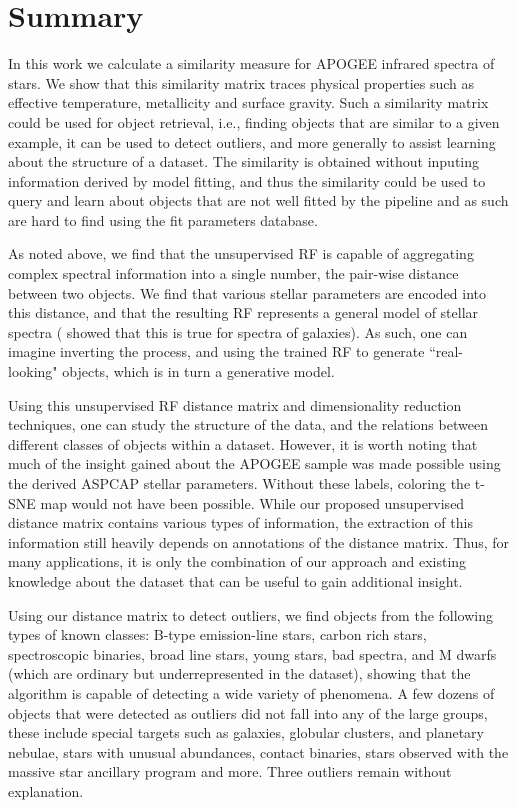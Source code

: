 \documentclass[fleqn,usenatbib]{mnras}
\begin{document}
\section{Summary}
\label{sec:sum}
In this work we calculate a similarity measure for APOGEE infrared spectra of stars. We show that this similarity matrix traces physical properties such as effective temperature, metallicity and surface gravity.  Such a similarity matrix could be used for object retrieval, i.e., finding objects that are similar to a given example, it can be used to detect outliers, and more generally to assist learning about the structure of a dataset. The similarity is obtained without inputing information derived by model fitting, and thus the similarity could be used to query and learn about objects that are not well fitted by the pipeline and as such are hard to find using the fit parameters database.

As noted above, we find that the unsupervised RF is capable of aggregating complex spectral information into a single number, the pair-wise distance between two objects. We find that various stellar parameters are encoded into this distance, and that the resulting RF represents a general model of stellar spectra (\cite{baron17a} showed that this is true for spectra of galaxies). As such, one can imagine inverting the process, and using the trained RF to generate ``real-looking" objects, which is in turn a generative model.

Using this unsupervised RF distance matrix and dimensionality reduction techniques, one can study the structure of the data, and the relations between different classes of objects within a dataset. However, it is worth noting that much of the insight gained about the APOGEE sample was made possible using the derived ASPCAP stellar parameters. Without these labels, coloring the t-SNE map would not have been possible. While our proposed unsupervised distance matrix contains various types of information, the extraction of this information still heavily depends on annotations of the distance matrix. Thus, for many applications, it is only the combination of our approach and existing knowledge about the dataset that can be useful to gain additional insight. 

Using our distance matrix to detect outliers, we find objects from the following types of known classes: B-type emission-line stars, carbon rich stars, spectroscopic binaries, broad line stars, young stars, bad spectra, and M dwarfs (which are ordinary but underrepresented in the dataset), showing that the algorithm is capable of detecting a wide variety of phenomena. A few dozens of objects that were detected as outliers did not fall into any of the large groups, these include special targets such as galaxies, globular clusters, and planetary nebulae, stars with unusual abundances, contact binaries, stars observed with the massive star ancillary program and more. Three outliers remain without explanation.
\end{document}
